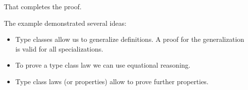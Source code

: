 That completes the proof.

The example demonstrated several ideas:
\begin{itemize}
\item Type classes allow us to generalize definitions. A proof for the generalization is valid for all specializations.
\item To prove a type class law we can use equational reasoning.
\item Type class laws (or properties) allow to prove further properties.
\end{itemize}

